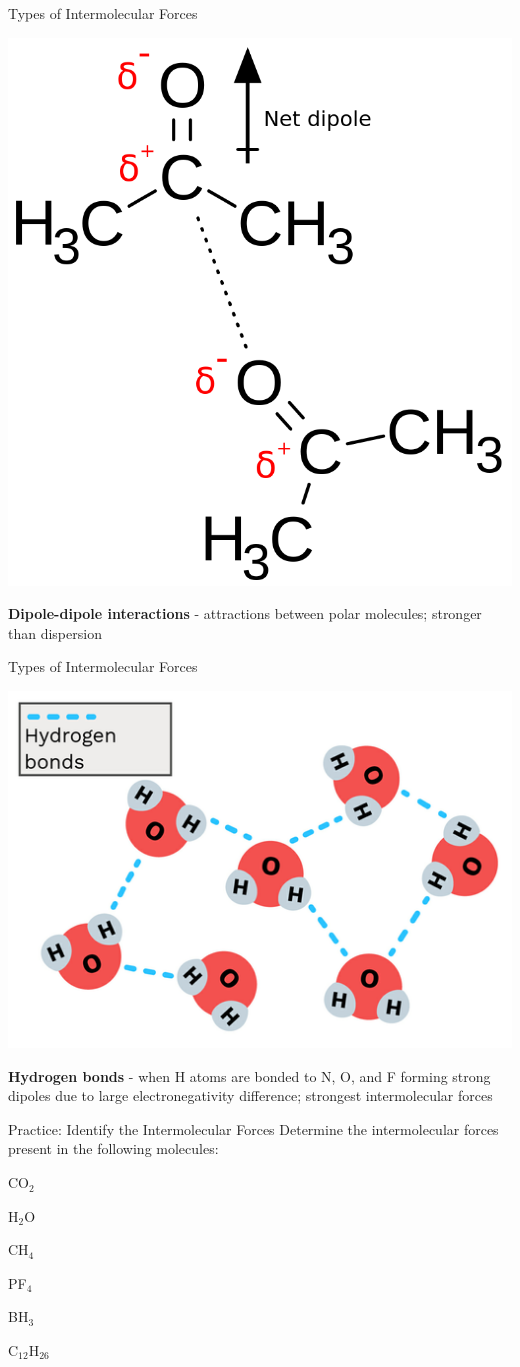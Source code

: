 \documentclass[11pt]{beamer}
\begin{document}
\begin{frame}{Types of Intermolecular Forces}
  \begin{center}
    \includegraphics[width=0.4\linewidth]{dipole_dipole}
  \end{center}
  \textbf{Dipole-dipole interactions} - attractions between polar
  molecules; stronger than dispersion
\end{frame}

\begin{frame}{Types of Intermolecular Forces}
  \begin{center}
    \includegraphics[width=0.5\linewidth]{water_hbond}
  \end{center}
  \textbf{Hydrogen bonds} - when H atoms are bonded to
  N, O, and F forming strong dipoles due to large electronegativity
  difference; strongest intermolecular forces
\end{frame}

\begin{frame}{Practice: Identify the Intermolecular Forces}
  Determine the intermolecular forces present in the following molecules:

  CO$_2$

  H$_2$O

  CH$_4$

  PF$_4$

  BH$_3$

  C$_{12}$H$_{26}$
\end{frame}
\end{document}
